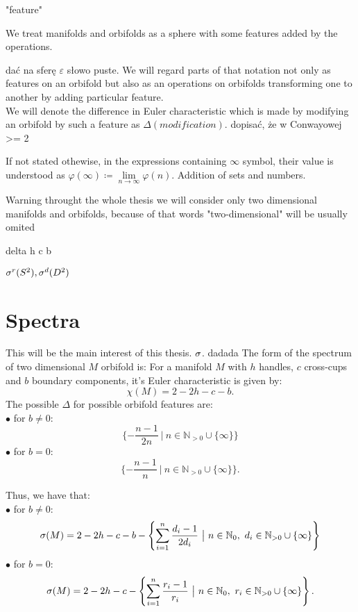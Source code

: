 "feature"

We treat manifolds and orbifolds as a sphere with some features added by the operations.

dać na sferę $\varepsilon$ słowo puste.
We will regard parts of that notation not only as features on an orbifold but also as an operations 
on orbifolds transforming one to another by adding particular feature. \\
We will denote the difference in Euler characteristic which is made by modifying 
an orbifold by such a feature as $\Delta(modification)$.
dopisać, że w Conwayowej >= 2

If not stated othewise, in the expressions containing $\infty$ symbol, their value is understood 
as $\varphi(\infty) \coloneqq \lim\limits_{n\to \infty}\varphi(n)$.
\todo{}
Addition of sets and numbers.

Warning throught the whole thesis we will consider only two dimensional manifolds and 
orbifolds, because of that words "two-dimensional" will be usually omited 

delta
h c b

${\sigma^r(S^2)}, {\sigma^d(D^2)}$ 

\section{Spectra}
This will be the main interest of this thesis. ${\sigma}$. dadada
The form of the spectrum of two dimensional $M$ orbifold is:
For a manifold $M$ with $h$ handles, $c$ cross-cups and $b$ boundary components, it's 
Euler characteristic is given by:
\begin{equation}
\chi(M) = 2-2h-c-b.
\end{equation}
The possible $\Delta$ for possible orbifold features are:\\
$\bullet$ for $b\neq 0$:
\begin{equation}
\{-\frac{n-1}{2n}\ \big|\ n\in\mathbb{N}_{>0}\cup \{\infty\}\}
\end{equation}
$\bullet$ for $b = 0$:
\begin{equation}
\{-\frac{n-1}{n}\ \big|\ n\in\mathbb{N}_{>0}\cup \{\infty\}\}.
\end{equation} 

Thus, we have that:\\
$\bullet$ for $b\neq 0$: 
\begin{equation}
\spe(M) = 2-2h-c-b - \left\{\sum\limits_{i=1}^n\frac{d_i-1}{2d_i}\ 
\big|\ n\in\mathbb{N}_0,\ d_i\in\mathbb{N}_{>0}\cup \{\infty\}\right\}
\end{equation}
$\bullet$ for $b = 0$:
\begin{equation}
\spe(M) = 2-2h-c - \left\{\sum\limits_{i=1}^n \frac{r_i-1}{r_i}\ \big|\ n\in\mathbb{N}_0,\ 
r_i\in\mathbb{N}_{>0}\cup \{\infty\}\right\}.
\end{equation} 
\label{two dim manifold spectrum}


